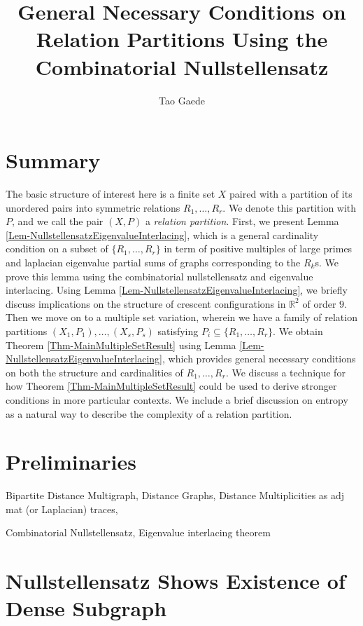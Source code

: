 \documentclass[12pt]{article}
\title{ \vspace{-3cm} General Necessary Conditions on Relation Partitions Using the Combinatorial Nullstellensatz}
\author{Tao Gaede}
\newcommand{\R}{\mathbb{R}}
\theoremstyle{definition}
\begin{document}
	\maketitle
	
	\section{Summary}
	The basic structure of interest here is a finite set $X$ paired with a partition of its unordered pairs into symmetric relations $R_1, \ldots, R_r$.  We denote this partition with $P$, and we call the pair $(X,P)$ a \emph{relation partition}.  First, we present Lemma \ref{Lem-NullstellensatzEigenvalueInterlacing}, which is a general cardinality condition on a subset of $\{R_1, \ldots, R_r\}$ in term of positive multiples of large primes and laplacian eigenvalue partial sums of graphs corresponding to the $R_k$s.  We prove this lemma using the combinatorial nullstellensatz and eigenvalue interlacing.  Using Lemma \ref{Lem-NullstellensatzEigenvalueInterlacing}, we briefly discuss implications on the structure of crescent configurations in $\R^2$ of order $9$.  Then we move on to a multiple set variation, wherein we have a family of relation partitions $(X_1,P_1), \ldots, (X_s,P_s)$ satisfying $P_i \subseteq\{R_1, \ldots, R_r\}$.  We obtain Theorem \ref{Thm-MainMultipleSetResult} using Lemma \ref{Lem-NullstellensatzEigenvalueInterlacing}, which provides general necessary conditions on both the structure and cardinalities of $R_1, \ldots, R_r$.  We discuss a technique for how Theorem \ref{Thm-MainMultipleSetResult} could be used to derive stronger conditions in more particular contexts.  We include a brief discussion on entropy as a natural way to describe the complexity of a relation partition.
	
	\iffalse
	\section{Preliminaries}
	
	Bipartite Distance Multigraph, Distance Graphs, Distance Multiplicities as adj mat (or Laplacian) traces,
	
	Combinatorial Nullstellensatz, Eigenvalue interlacing theorem
	
	\section{Nullstellensatz Shows Existence of Dense Subgraph}
	
\end{document}
